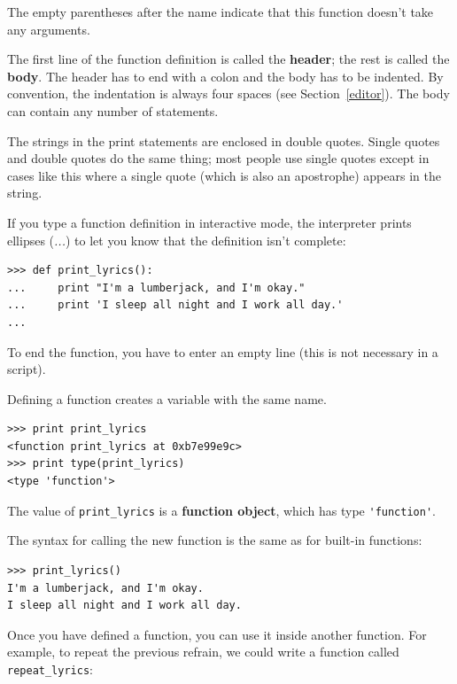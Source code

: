 \documentclass[10pt]{book}
\begin{document}

The empty parentheses after the name indicate that this function
doesn't take any arguments.


The first line of the function definition is called the {\bf header};
the rest is called the {\bf body}.  The header has to end with a colon
and the body has to be indented.  By convention, the indentation is
always four spaces (see Section~\ref{editor}).  The body can contain
any number of statements.

The strings in the print statements are enclosed in double
quotes.  Single quotes and double quotes do the same thing;
most people use single quotes except in cases like this where
a single quote (which is also an apostrophe) appears in the string.


If you type a function definition in interactive mode, the interpreter
prints ellipses ({\em ...}) to let you know that the definition
isn't complete:

\beforeverb
\begin{verbatim}
>>> def print_lyrics():
...     print "I'm a lumberjack, and I'm okay."
...     print 'I sleep all night and I work all day.'
...
\end{verbatim}
\afterverb
%
To end the function, you have to enter an empty line (this is
not necessary in a script).

Defining a function creates a variable with the same name.

\beforeverb
\begin{verbatim}
>>> print print_lyrics
<function print_lyrics at 0xb7e99e9c>
>>> print type(print_lyrics)
<type 'function'>
\end{verbatim}
\afterverb
%
The value of \verb"print_lyrics" is a {\bf function object}, which
has type \verb"'function'".


The syntax for calling the new function is the same as
for built-in functions:

\beforeverb
\begin{verbatim}
>>> print_lyrics()
I'm a lumberjack, and I'm okay.
I sleep all night and I work all day.
\end{verbatim}
\afterverb
%
Once you have defined a function, you can use it inside another
function.  For example, to repeat the previous refrain, we could write
a function called \verb"repeat_lyrics":
\end{document}
